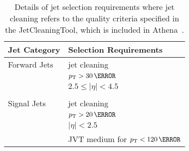 \begin{table}[h]
  \centering
  \begin{tabular}{l l}
    \toprule
    {\bfseries Jet Category} & {\bfseries Selection Requirements} \\
    \midrule
    Forward Jets & jet cleaning \\
    & $p_{\mathrm{T}} > 30\,\GeV$ \\
    & $2.5 \leq \left|\eta\right| < 4.5$ \\ 
    &\\
    Signal Jets & jet cleaning \\
    & $p_{\mathrm{T}} > 20\,\GeV$ \\
    & $ \left|\eta\right| < 2.5$ \\ 
    & JVT medium for $p_{\mathrm{T}} < 120\,\GeV$ \\
    \bottomrule
  \end{tabular}
  \caption[Jet selection requirements.]{Details of jet selection requirements
    where jet cleaning refers to the quality criteria specified in the
    JetCleaningTool, which is included in
    Athena~\cite{ATLAS-CONF-2015-029,Gonski:2272136}.}
  \label{tab:jet-cats}
\end{table}